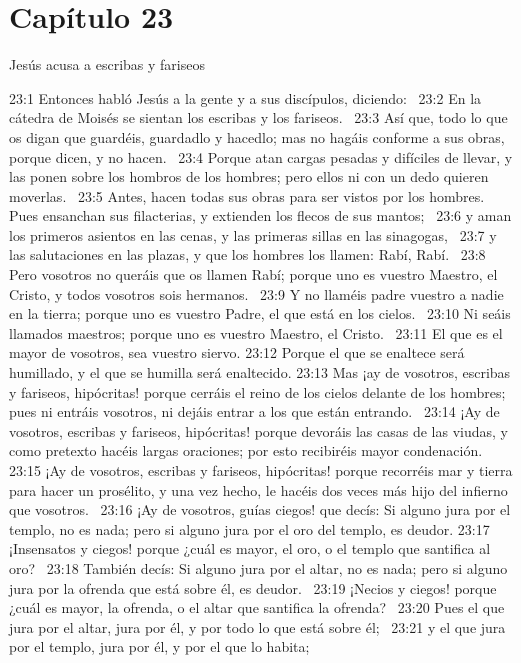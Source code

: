 \section*{Capítulo 23}
Jesús acusa a escribas y fariseos   

23:1 Entonces habló Jesús a la gente y a sus discípulos, diciendo:  
23:2 En la cátedra de Moisés se sientan los escribas y los fariseos.  
23:3 Así que, todo lo que os digan que guardéis, guardadlo y hacedlo; mas no hagáis conforme a sus obras, porque dicen, y no hacen.  
23:4 Porque atan cargas pesadas y difíciles de llevar, y las ponen sobre los hombros de los hombres; pero ellos ni con un dedo quieren moverlas.  
23:5 Antes, hacen todas sus obras para ser vistos por los hombres. Pues ensanchan sus filacterias, y extienden los flecos de sus mantos;  
23:6 y aman los primeros asientos en las cenas, y las primeras sillas en las sinagogas,  
23:7 y las salutaciones en las plazas, y que los hombres los llamen: Rabí, Rabí.  
23:8 Pero vosotros no queráis que os llamen Rabí; porque uno es vuestro Maestro, el Cristo, y todos vosotros sois hermanos.  
23:9 Y no llaméis padre vuestro a nadie en la tierra; porque uno es vuestro Padre, el que está en los cielos.  
23:10 Ni seáis llamados maestros; porque uno es vuestro Maestro, el Cristo.  
23:11 El que es el mayor de vosotros, sea vuestro siervo. 
23:12 Porque el que se enaltece será humillado, y el que se humilla será enaltecido. 
23:13 Mas ¡ay de vosotros, escribas y fariseos, hipócritas! porque cerráis el reino de los cielos delante de los hombres; pues ni entráis vosotros, ni dejáis entrar a los que están entrando.  
23:14 ¡Ay de vosotros, escribas y fariseos, hipócritas! porque devoráis las casas de las viudas, y como pretexto hacéis largas oraciones; por esto recibiréis mayor condenación.  
23:15 ¡Ay de vosotros, escribas y fariseos, hipócritas! porque recorréis mar y tierra para hacer un prosélito, y una vez hecho, le hacéis dos veces más hijo del infierno que vosotros.  
23:16 ¡Ay de vosotros, guías ciegos! que decís: Si alguno jura por el templo, no es nada; pero si alguno jura por el oro del templo, es deudor. 
23:17 ¡Insensatos y ciegos! porque ¿cuál es mayor, el oro, o el templo que santifica al oro?  
23:18 También decís: Si alguno jura por el altar, no es nada; pero si alguno jura por la ofrenda que está sobre él, es deudor.  
23:19 ¡Necios y ciegos! porque ¿cuál es mayor, la ofrenda, o el altar que santifica la ofrenda?  
23:20 Pues el que jura por el altar, jura por él, y por todo lo que está sobre él;  
23:21 y el que jura por el templo, jura por él, y por el que lo habita;  
